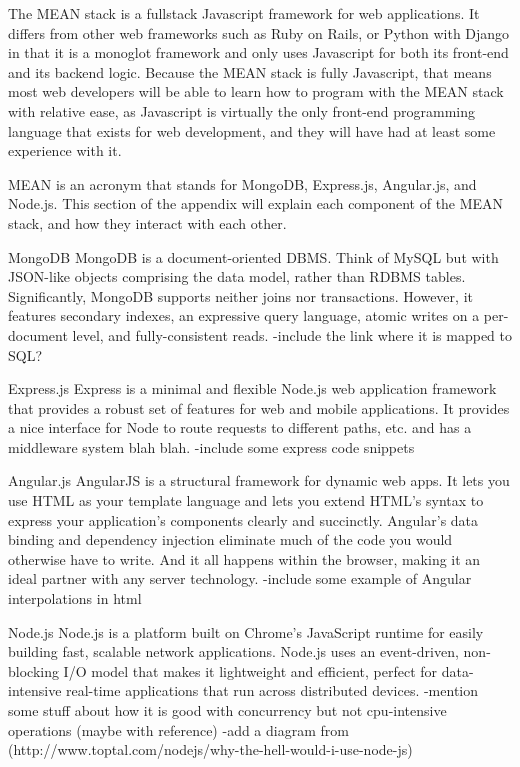 \documentclass[12pt]{article}
\begin{document}

The MEAN stack is a fullstack Javascript framework for web applications. It differs from other web frameworks such as Ruby on Rails, or Python with Django in that it is a monoglot framework and only uses Javascript for both its front-end and its backend logic. Because the MEAN stack is fully Javascript, that means most web developers will be able to learn how to program with the MEAN stack with relative ease, as Javascript is virtually the only front-end programming language that exists for web development, and they will have had at least some experience with it.

MEAN is an acronym that stands for MongoDB, Express.js, Angular.js, and Node.js. This section of the appendix will explain each component of the MEAN stack, and how they interact with each other.

MongoDB %
MongoDB is a document-oriented DBMS. Think of MySQL but with JSON-like objects comprising the data model, rather than RDBMS tables. Significantly, MongoDB supports neither joins nor transactions. However, it features secondary indexes, an expressive query language, atomic writes on a per-document level, and fully-consistent reads.
-include the link where it is mapped to SQL?

Express.js %
Express is a minimal and flexible Node.js web application framework that provides a robust set of features for web and mobile applications.
It provides a nice interface for Node to route requests to different paths, etc. and has a middleware system blah blah.
-include some express code snippets

Angular.js %
AngularJS is a structural framework for dynamic web apps. It lets you use HTML as your template language and lets you extend HTML's syntax to express your application's components clearly and succinctly. Angular's data binding and dependency injection eliminate much of the code you would otherwise have to write. And it all happens within the browser, making it an ideal partner with any server technology.
-include some example of Angular interpolations in html

Node.js %
Node.js is a platform built on Chrome's JavaScript runtime for easily building fast, scalable network applications. Node.js uses an event-driven, non-blocking I/O model that makes it lightweight and efficient, perfect for data-intensive real-time applications that run across distributed devices.
-mention some stuff about how it is good with concurrency but not cpu-intensive operations (maybe with reference)
-add a diagram from (http://www.toptal.com/nodejs/why-the-hell-would-i-use-node-js)
\end{document}
